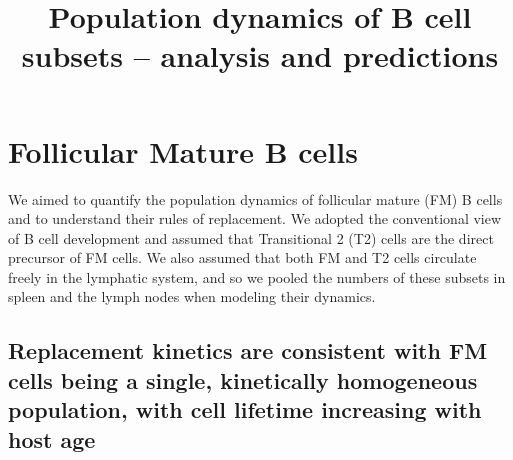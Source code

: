 \documentclass[11pt]{article}
\title{Population dynamics of  B cell subsets -- analysis and predictions}
\author{}
\date{}
\newcommand{\red}[1]{{\color{red}{#1}}}
\begin{document}
 
\maketitle

\section*{Follicular Mature B cells}

We aimed to quantify the population dynamics of follicular mature (FM) B cells and to understand their rules of replacement.  We adopted the conventional view of B cell development and assumed that Transitional 2 (T2) cells are the direct precursor of FM cells. We also assumed that both FM and T2 cells circulate freely in the lymphatic system, and so we pooled the numbers of these subsets in spleen and the lymph nodes when modeling their dynamics.






\red{One concern: Sanket tried T1 as source and it actually gives better fits in all FM cases ($\Delta$AIC $\simeq$ 5). But we are going with dogma and saying T2 is source. It's puzzling to us that there is apparently so much residual Ki67 expression in FM from the T2 source, if all the division is pre-T1 as you say. Makes me worry a littl...} 

\subsection*{Replacement kinetics are consistent with FM cells being a single, kinetically homogeneous population, with cell lifetime increasing with host age}
\end{document}
